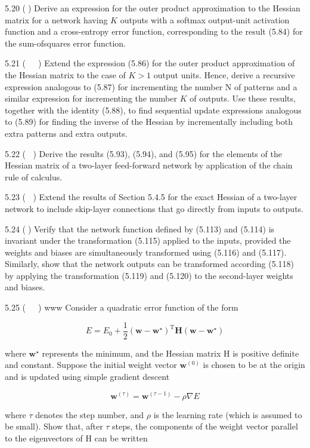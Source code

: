 \documentclass[
  10
]{article}
\begin{document}
5.20 () Derive an expression for the outer product approximation to the
Hessian matrix for a network having \(K\) outputs with a softmax
output-unit activation function and a cross-entropy error function,
corresponding to the result (5.84) for the sum-ofsquares error function.

5.21 (  ) Extend the expression (5.86) for the outer product
approximation of the Hessian matrix to the case of \(K > 1\) output
units. Hence, derive a recursive expression analogous to (5.87) for
incrementing the number N of patterns and a similar expression for
incrementing the number \(K\) of outputs. Use these results, together
with the identity (5.88), to find sequential update expressions
analogous to (5.89) for finding the inverse of the Hessian by
incrementally including both extra patterns and extra outputs.

5.22 ( ) Derive the results (5.93), (5.94), and (5.95) for the elements
of the Hessian matrix of a two-layer feed-forward network by application
of the chain rule of calculus.

5.23 ( ) Extend the results of Section 5.4.5 for the exact Hessian of a
two-layer network to include skip-layer connections that go directly
from inputs to outputs.

5.24 () Verify that the network function defined by (5.113) and (5.114)
is invariant under the transformation (5.115) applied to the inputs,
provided the weights and biases are simultaneously transformed using
(5.116) and (5.117). Similarly, show that the network outputs can be
transformed according (5.118) by applying the transformation (5.119) and
(5.120) to the second-layer weights and biases.

5.25 (  ) www Consider a quadratic error function of the form

\[
E = E _ {0} + \frac {1}{2} (\mathbf {w} - \mathbf {w} ^ {\star}) ^ {\mathrm{T}} \mathbf {H} (\mathbf {w} - \mathbf {w} ^ {\star})\tag{5.195}
\]

where \(\mathbf { w } ^ { \star }\) represents the minimum, and the
Hessian matrix H is positive definite and constant. Suppose the initial
weight vector \(\mathbf { w } ^ { ( 0 ) }\) is chosen to be at the
origin and is updated using simple gradient descent

\[
\mathbf {w} ^ {(\tau)} = \mathbf {w} ^ {(\tau - 1)} - \rho \nabla E\tag{5.196}
\]

where \(\tau\) denotes the step number, and \(\rho\) is the learning
rate (which is assumed to be small). Show that, after \(\tau\) steps,
the components of the weight vector parallel to the eigenvectors of H
can be written
\end{document}
